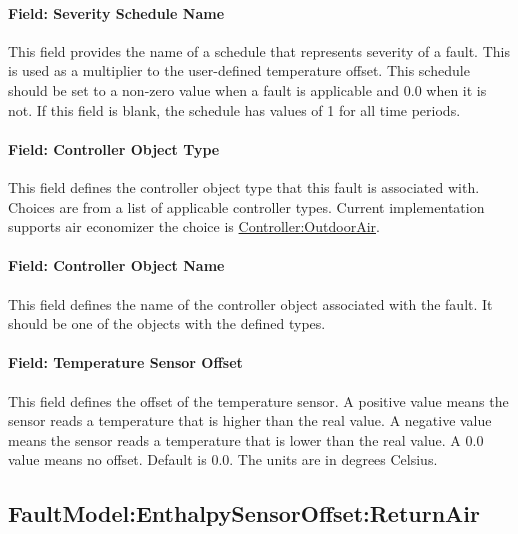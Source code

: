 \paragraph{Field: Severity Schedule Name}\label{field-severity-schedule-name-3}

This field provides the name of a schedule that represents severity of a fault. This is used as a multiplier to the user-defined temperature offset. This schedule should be set to a non-zero value when a fault is applicable and 0.0 when it is not. If this field is blank, the schedule has values of 1 for all time periods.

\paragraph{Field: Controller Object Type}\label{field-controller-object-type-3}

This field defines the controller object type that this fault is associated with. Choices are from a list of applicable controller types. Current implementation supports air economizer the choice is \hyperref[controlleroutdoorair]{Controller:OutdoorAir}.

\paragraph{Field: Controller Object Name}\label{field-controller-object-name-3}

This field defines the name of the controller object associated with the fault. It should be one of the objects with the defined types.

\paragraph{Field: Temperature Sensor Offset}\label{field-temperature-sensor-offset-1}

This field defines the offset of the temperature sensor. A positive value means the sensor reads a temperature that is higher than the real value. A negative value means the sensor reads a temperature that is lower than the real value. A 0.0 value means no offset. Default is 0.0. The units are in degrees Celsius.

\subsection{FaultModel:EnthalpySensorOffset:ReturnAir}\label{faultmodelenthalpysensoroffsetreturnair}

